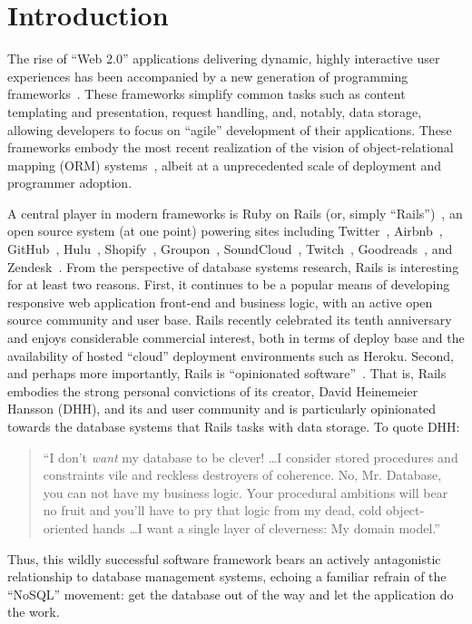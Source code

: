 
\section{Introduction}
\label{sec:intro}

The rise of ``Web 2.0'' applications delivering dynamic, highly
interactive user experiences has been accompanied by a new generation
of programming frameworks~\cite{web20}. These frameworks simplify
common tasks such as content templating and presentation, request
handling, and, notably, data storage, allowing developers to focus on
``agile'' development of their applications. These frameworks embody
the most recent realization of the vision of object-relational mapping
(ORM) systems~\cite{orm-db}, albeit at a unprecedented scale of deployment and
programmer adoption.

A central player in modern frameworks is Ruby on Rails (or, simply
``Rails'')~\cite{rails-book,rails-computer}, an open source system (at one point) powering sites
including Twitter~\cite{twitter-rails}, Airbnb~\cite{airbnb-rails},
GitHub~\cite{github-rails}, Hulu~\cite{hulu-rails}, Shopify~\cite{shopify-rails},
Groupon~\cite{groupon-rails}, SoundCloud~\cite{soundcloud-rails}, Twitch~\cite{twitch-rails},
Goodreads~\cite{goodreads-rails}, and Zendesk~\cite{zendesk-rails}. From the perspective of database systems
research, Rails is interesting for at least two reasons. First, it
continues to be a popular means of developing responsive web
application front-end and business logic, with an active open source
community and user base. Rails recently celebrated its tenth
anniversary and enjoys considerable commercial interest, both in terms
of deploy base and the availability of hosted ``cloud'' deployment environments such as
Heroku. Second, and perhaps more importantly, Rails is ``opinionated
software''~\cite{dhh-opinionated}. That is, Rails embodies the strong personal convictions
of its creator, David Heinemeier Hansson (DHH), and its and user
community and is particularly opinionated towards the database systems
that Rails tasks with data storage. To
quote DHH:
\begin{quote}
``I don't \textit{want} my database to be clever! \dots I consider stored procedures and constraints vile and reckless destroyers of coherence. No, Mr. Database, you can not have my business logic. Your procedural ambitions will bear no fruit and you'll have to pry that logic from my dead, cold object-oriented hands \dots I want a single layer of cleverness: My domain model.''~\cite{dhh-clever}
\end{quote}
Thus, this wildly successful software framework bears an actively
antagonistic relationship to database management systems, echoing a familiar refrain of the ``NoSQL'' movement: get the database out of the way and let the application do the work.

